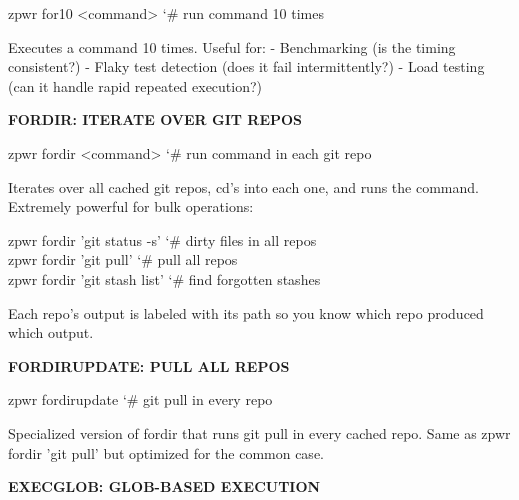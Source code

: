 \documentclass[11pt,a4paper,twoside]{book}
\begin{document}
\begin{codebox}
\color{neongreen}zpwr for10 <command>                {\char`\#} run command 10 times\\
\end{codebox}

Executes a command 10 times. Useful for: - Benchmarking (is the timing consistent?) - Flaky test detection (does it fail intermittently?) - Load testing (can it handle rapid repeated execution?)


\vspace{12pt}
{\bfseries\color{neonyellow} FORDIR: ITERATE OVER GIT REPOS}\vspace{4pt}

\begin{codebox}
\color{neongreen}zpwr fordir <command>               {\char`\#} run command in each git repo\\
\end{codebox}

Iterates over all cached git repos, cd's into each one, and runs the command. Extremely powerful for bulk operations:

\begin{codebox}
\color{neongreen}zpwr fordir 'git status -s'         {\char`\#} dirty files in all repos\\
\color{neongreen}zpwr fordir 'git pull'              {\char`\#} pull all repos\\
\color{neongreen}zpwr fordir 'git stash list'        {\char`\#} find forgotten stashes\\
\end{codebox}

Each repo's output is labeled with its path so you know which repo produced which output.


\vspace{12pt}
{\bfseries\color{neonyellow} FORDIRUPDATE: PULL ALL REPOS}\vspace{4pt}

\begin{codebox}
\color{neongreen}zpwr fordirupdate                   {\char`\#} git pull in every repo\\
\end{codebox}

Specialized version of fordir that runs git pull in every cached repo. Same as zpwr fordir 'git pull' but optimized for the common case.


\vspace{12pt}
{\bfseries\color{neonyellow} EXECGLOB: GLOB-BASED EXECUTION}\vspace{4pt}
\end{document}
